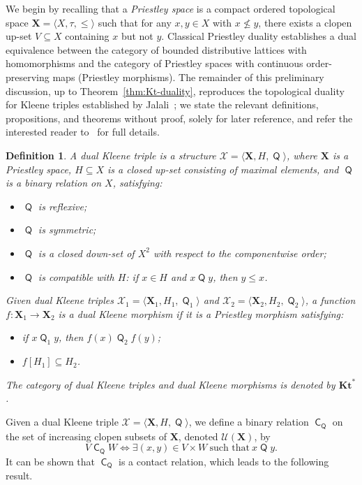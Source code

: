 \documentclass[10pt,a4paper]{amsart}
\newtheorem{definition}[theorem]{Definition}
\DeclareMathOperator{\con}{\mathsf{C}}
\DeclareMathOperator{\Q}{\mathsf{Q}}
\newcommand{\X}{\mathbf{X}}
\newcommand{\U}{\mathcal{U}}
\begin{document}
We begin by recalling that a \emph{Priestley space} is a compact ordered topological space $\X = \langle X, \tau, \leq \rangle$ such that for any $x,y \in X$ with $x \not\leq y$, there exists a clopen up-set $V \subseteq X$ containing $x$ but not $y$. Classical Priestley duality establishes a dual equivalence between the category of bounded distributive lattices with homomorphisms and the category of Priestley spaces with continuous order-preserving maps (Priestley morphisms). The remainder of this preliminary discussion, up to Theorem~\ref{thm:Kt-duality}, reproduces the topological duality for Kleene triples established by Jalali~\cite{jalali}; we state the relevant definitions, propositions, and theorems without proof, solely for later reference, and refer the interested reader to~\cite{jalali, viglizzo99algebras} for full details.

\begin{definition}
\label{def:dual-kleene-triple}
A \emph{dual Kleene triple} is a structure $\mathcal{X}=\langle \X, H, \Q \rangle$, where $\X$ is a Priestley space, $H\subseteq X$ is a closed up-set consisting of maximal elements, and $\Q$ is a binary relation on $X$, satisfying:
\begin{itemize}
    \item $\Q$ is reflexive;
    \item $\Q$ is symmetric;
    \item $\Q$ is a closed down-set of $X^2$ with respect to the componentwise order;
    \item $\Q$ is compatible with $H$: if $x\in H$ and $x\Q y$, then $y\le x$.
\end{itemize}

Given dual Kleene triples $\mathcal{X}_1=\langle \X_1,H_1,\Q_1\rangle$ and $\mathcal{X}_2=\langle \X_2,H_2,\Q_2\rangle$, a function $f \colon \X_1 \to \X_2$ is a \emph{dual Kleene morphism} if it is a Priestley morphism satisfying:
\begin{itemize}
    \item if $x \Q_1 y$, then $f(x) \Q_2 f(y)$;
    \item $f[H_1]\subseteq H_2$.
\end{itemize}

The category of dual Kleene triples and dual Kleene morphisms is denoted by $\mathbf{Kt}^{*}$.
\end{definition}

Given a dual Kleene triple $\mathcal{X}=\langle \X, H, \Q \rangle$, we define a binary relation $\con_{\Q}$ on the set of increasing clopen subsets of $\X$, denoted $\U(\X)$, by
\[
    V \con_{\Q} W \iff \exists (x,y) \in V \times W \ \text{such that} \ x\Q y.
\]
It can be shown that $\con_{\Q}$ is a contact relation, which leads to the following result.
\end{document}
